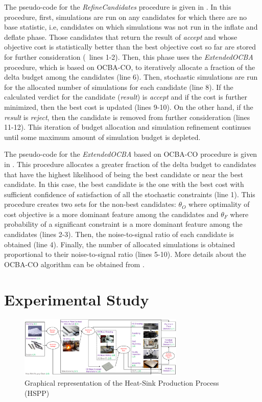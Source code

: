 \documentclass[a4paper, 12pt]{article} %
\begin{document}
The pseudo-code for the \textit{RefineCandidates} procedure is given in \algoRefineCand. 
In this procedure, first, simulations are run on any candidates for which there are no base statistic, i.e, candidates on which simulations was not run in the inflate and deflate phase. Those candidates that return the result of \textit{accept} and whose objective cost is statistically better than the best objective cost so far are stored for further consideration (\algoRefineCand~lines 1-2).
Then, this phase uses the \textit{ExtendedOCBA} procedure, which is based on OCBA-CO, to iteratively allocate a fraction of the delta budget among the candidates (line 6).
Then, stochastic simulations are run for the allocated number of simulations for each candidate (line 8).
If the calculated verdict for the candidate (\textit{result}) is \textit{accept} and if the cost is further minimized, then the best cost is updated (lines 9-10).
On the other hand, if the \textit{result} is \textit{reject}, then the candidate is removed from further consideration (lines 11-12).
This iteration of budget allocation and simulation refinement continues until some maximum amount of simulation budget is depleted.

The pseudo-code for the \textit{ExtendedOCBA} based on OCBA-CO procedure is given in \algoExOCBA.
This procedure allocates a greater fraction of the delta budget to candidates that have the highest likelihood of being the best candidate or near the best candidate. 
In this case, the best candidate is the one with the best cost with sufficient confidence of satisfaction of all the stochastic constraints (line 1).
This procedure creates two sets for the non-best candidates: $\theta_O$ where optimality of cost objective is a more dominant feature among the candidates and $\theta_F$ where probability of a significant constraint is a more dominant feature among the candidates (lines 2-3). 
Then, the noise-to-signal ratio of each candidate is obtained (line 4).
Finally, the number of allocated simulations is obtained proportional to their noise-to-signal ratio (lines 5-10). 
More details about the OCBA-CO algorithm can be obtained from \cite{Lee2012OCBACO}.

\section{Experimental Study}
\label{sec:expResults}

\begin{figure}
	\begin{center}
		\includegraphics[width=0.7\textwidth]{images/HeatSink_contractSN.pdf}
		\caption{Graphical representation of the Heat-Sink Production Process (HSPP)}
		\label{fig:heatsinkSC}       %
	\end{center}
\end{figure}
\end{document}
